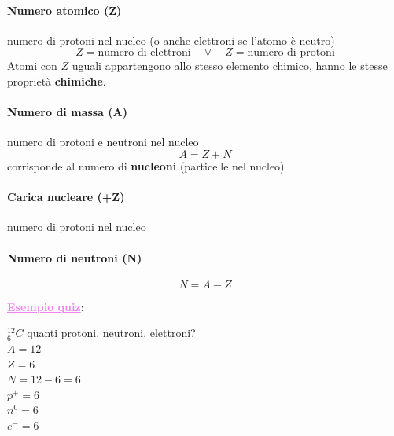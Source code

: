 \documentclass[twoside]{article}
\begin{document}
\paragraph[short]{Numero atomico (Z)} numero di protoni nel nucleo (o anche elettroni se l'atomo è neutro)
\begin{equation}
  \boxed{Z = \text{numero di elettroni} \quad \lor \quad Z = \text{numero di protoni}}
\end{equation}
Atomi con \(Z\) uguali appartengono allo stesso elemento chimico, hanno le stesse proprietà \textbf{chimiche}.
\paragraph[short]{Numero di massa (A)} numero di protoni e neutroni nel nucleo
\begin{equation}
  \boxed{A = Z + N}
\end{equation}
corrisponde al numero di \textbf{nucleoni} (particelle nel nucleo)
\paragraph[short]{Carica nucleare (+Z)}
numero di protoni nel nucleo
\paragraph[short]{Numero di neutroni (N)}
\begin{equation}
  \boxed{N = A - Z}
\end{equation}
\begin{center}
  \small
  \begin{minipage}{0.7\textwidth}
    \textcolor{violet}{\uline{\textbf{Esempio quiz}}}:\\
    \begin{figure}[H]
      \centering
    \end{figure}
    \(^{12}_{6}C\) quanti protoni, neutroni, elettroni?\\
    \(A = 12\)\\
    \(Z = 6\)\\
    \(N = 12 - 6 = 6\)\\
    \(p^+ = 6\)\\
    \(n^0 = 6\)\\
    \(e^- = 6\)\\
  \end{minipage}
\end{center}
\end{document}
